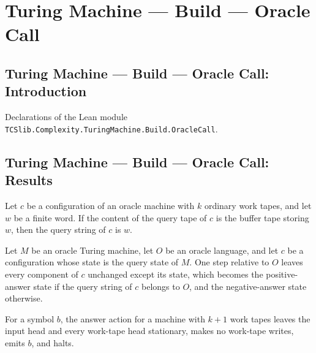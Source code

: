\section{Turing Machine --- Build --- Oracle Call}
\subsection*{Turing Machine --- Build --- Oracle Call: Introduction}

Declarations of the Lean module \texttt{TCSlib.Complexity.TuringMachine.Build.OracleCall}.

\subsection*{Turing Machine --- Build --- Oracle Call: Results}

\begin{theorem}
\label{Turing.OracleTM.queryString_bufferTape}
\leanok
{}
Let $c$ be a configuration of an oracle machine with $k$ ordinary work tapes, and let
$w$ be a finite word. If the content of the query tape of $c$ is the buffer tape storing
$w$, then the query string of $c$ is $w$.
\end{theorem}

\begin{theorem}
\label{Turing.OracleTM.step_of_qQuery}
\leanok
{}
Let $M$ be an oracle Turing machine, let $O$ be an oracle language, and let $c$ be a
configuration whose state is the query state of $M$. One step relative to $O$ leaves
every component of $c$ unchanged except its state, which becomes the positive-answer
state if the query string of $c$ belongs to $O$, and the negative-answer state
otherwise.
\end{theorem}

\begin{definition}
\label{Turing.OracleTM.answerAction}
\leanok
{}
For a symbol $b$, the answer action for a machine with $k+1$ work tapes leaves the input
head and every work-tape head stationary, makes no work-tape writes, emits $b$, and
halts.
\end{definition}

